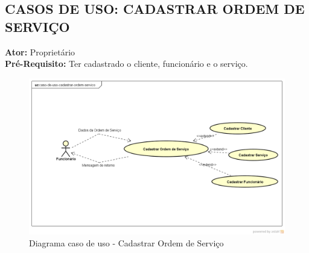 \subsection{CASOS DE USO: CADASTRAR ORDEM DE SERVIÇO}
\begin{flushleft}
\textbf{Ator:}  Proprietário
\\
\textbf{Pré-Requisito:} Ter cadastrado o cliente, funcionário e o serviço.
\end{flushleft}

\begin{figure}[htb]
	\caption{\label{fig_cliente} Diagrama caso de uso - Cadastrar Ordem de Serviço}
	\begin{center}
	    \includegraphics[width=0.7\linewidth]{imagens/cadastrar-ordem-de-servico.png}
	\end{center}
\end{figure}

\newpage

